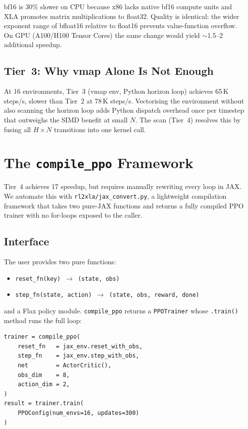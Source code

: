 \documentclass[11pt,twocolumn]{article}
\begin{document}
bf16 is 30\% slower on CPU because x86 lacks native bf16 compute units and
XLA promotes matrix multiplications to float32. Quality is identical: the
wider exponent range of bfloat16 relative to float16 prevents value-function
overflow. On GPU (A100/H100 Tensor Cores) the same change would yield
$\sim$1.5--2\texttimes{} additional speedup.

\subsection{Tier~3: Why vmap Alone Is Not Enough}

At 16 environments, Tier~3 (vmap env, Python horizon loop) achieves
65\,K steps/s, slower than Tier~2 at 78\,K steps/s. Vectorising the
environment without also scanning the horizon loop adds Python dispatch
overhead once per timestep that outweighs the SIMD benefit at small $N$.
The scan (Tier~4) resolves this by fusing all $H \times N$ transitions into
one kernel call.

\section{The \texttt{compile\_ppo} Framework}

Tier~4 achieves 17\texttimes{} speedup, but requires manually rewriting
every loop in JAX. We automate this with \texttt{rl2xla/jax\_convert.py},
a lightweight compilation framework that takes two pure-JAX functions and
returns a fully compiled PPO trainer with no for-loops exposed to the caller.

\subsection{Interface}

The user provides two pure functions:
\begin{itemize}
  \item \texttt{reset\_fn(key) $\to$ (state, obs)}
  \item \texttt{step\_fn(state, action) $\to$ (state, obs, reward, done)}
\end{itemize}
and a Flax policy module.
\texttt{compile\_ppo} returns a \texttt{PPOTrainer} whose \texttt{.train()}
method runs the full loop:

\begin{footnotesize}\begin{verbatim}
trainer = compile_ppo(
    reset_fn   = jax_env.reset_with_obs,
    step_fn    = jax_env.step_with_obs,
    net        = ActorCritic(),
    obs_dim    = 8,
    action_dim = 2,
)
result = trainer.train(
    PPOConfig(num_envs=16, updates=300)
)
\end{verbatim}\end{footnotesize}
\end{document}
